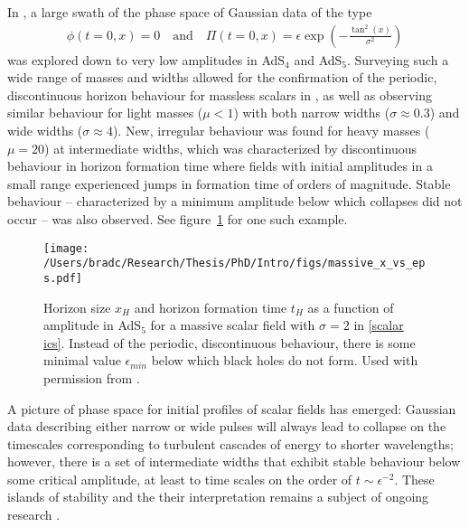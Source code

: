 \documentclass[../PhD.tex]{subfiles}
\begin{document}
In \cite{1508.02709}, a large swath of the phase space of Gaussian data of the type
\begin{align}
\label{scalar ics}
\phi(t=0,x) = 0 \quad \text{and} \quad \Pi (t=0,x) = \epsilon \exp \left( - \frac{\tan^2 (x)}{\sigma^2} \right)
\end{align}
was explored down to very low amplitudes in AdS$_4$ and AdS$_5$. Surveying such a wide range of masses and widths allowed for the confirmation of the periodic, discontinuous horizon behaviour for massless scalars in \cite{1104.3702}, as well as observing similar behaviour for light masses ($\mu < 1$) with both narrow widths ($\sigma \approx 0.3$) and wide widths ($\sigma \approx 4$). New, irregular behaviour was found for heavy masses ($\mu = 20$) at intermediate widths, which was characterized by discontinuous behaviour in horizon formation time where fields with initial amplitudes in a small range experienced jumps in formation time of orders of magnitude. Stable behaviour -- characterized by a minimum amplitude below which collapses did not occur -- was also observed. See figure~\ref{fig: massive x vs eps} for one such example.

\begin{figure}[h]
	\centering
	\texttt{[image: /Users/bradc/Research/Thesis/PhD/Intro/figs/massive\_x\_vs\_eps.pdf]}
	\caption[Horizon size and horizon formation time for a massive scalar]{Horizon size $x_H$ and horizon formation time $t_H$ as a function of amplitude in AdS$_5$ for a massive scalar field with $\sigma = 2$ in {\rm\eqref{scalar ics}}. Instead of the periodic, discontinuous behaviour, there is some minimal value $\epsilon_{min}$ below which black holes do not form. Used with permission from {\rm\cite{1508.02709}}.}
	\label{fig: massive x vs eps}
\end{figure}

A picture of phase space for initial profiles of scalar fields has emerged: Gaussian data describing either narrow or wide pulses will always lead to collapse on the timescales corresponding to turbulent cascades of energy to shorter wavelengths; however, there is a set of intermediate widths that exhibit stable behaviour below some critical amplitude, at least to time scales on the order of $t \sim \epsilon^{-2}$. These islands of stability and the their interpretation remains a subject of ongoing research \cite{1507.08261, TTF, 1706.07413, 1803.02830, 1912.07143}.
\end{document}
